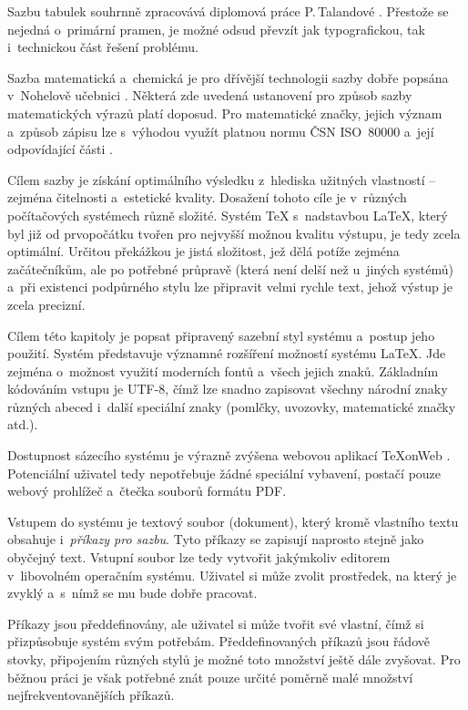 \documentclass[twoside,12pt]{article}%
\begin{document}
Sazbu tabulek souhrnně zpracovává diplomová práce P.\,Talandové
\cite{TalDipl}. Přestože se nejedná o~primární pramen, je možné odsud převzít
jak typografickou, tak i~technickou část řešení problému.

Sazba matematická a~chemická je pro dřívější technologii sazby dobře popsána
v~Nohelově učebnici \cite{Nohel}. Některá zde uvedená ustanovení pro způsob
sazby matematických výrazů platí doposud. Pro matematické značky, jejich
význam a~způsob zápisu lze s~výhodou využít platnou normu ČSN ISO~80000 a~její
odpovídající části \cite{csn80000, csn80000m}.


Cílem sazby je získání optimálního výsledku z~hlediska užitných vlastností --
zejména čitelnosti a~estetické kvality. Dosažení tohoto cíle je v~různých
počítačových systémech různě složité. Systém \TeX{} s~nadstavbou \LaTeX, který
byl již od prvopočátku tvořen pro nejvyšší možnou kvalitu výstupu, je tedy
zcela optimální. Určitou překážkou je jistá složitost, jež dělá potíže zejména
začátečníkům, ale po potřebné průpravě (která není delší než u~jiných systémů)
a~při existenci podpůrného stylu lze připravit velmi rychle text, jehož výstup
je zcela precizní.

Cílem této kapitoly je popsat připravený sazební styl systému \XeLaTeX{}
a~postup jeho použití. Systém \XeLaTeX{} představuje významné rozšíření možností
systému \LaTeX. Jde zejména o~možnost využití moderních fontů a~všech jejich
znaků. Základním kódováním vstupu je UTF-8, čímž lze snadno zapisovat všechny
národní znaky různých abeced i~další speciální znaky (pomlčky, uvozovky,
matematické značky atd.).

Dostupnost sázecího systému je výrazně zvýšena webovou aplikací \TeX onWeb
\cite{texonweb}. Potenciální uživatel tedy nepotřebuje žádné speciální vybavení,
postačí pouze webový prohlížeč a~čtečka souborů formátu PDF.

Vstupem do systému je textový soubor (dokument), který kromě vlastního textu
obsahuje i~\textit{příkazy pro sazbu}. Tyto příkazy se zapisují naprosto
stejně jako obyčejný text. Vstupní soubor lze tedy vytvořit jakýmkoliv
editorem v~libovolném operačním systému. Uživatel si může zvolit prostředek,
na který je  zvyklý a~s~nímž se mu bude dobře pracovat.

Příkazy jsou předdefinovány, ale uživatel si může tvořit své vlastní, čímž si
přizpůsobuje systém svým potřebám. Předdefinovaných příkazů jsou řádově
stovky, připojením různých stylů je možné toto množství ještě dále zvyšovat.
Pro běžnou práci je však potřebné znát pouze určité poměrně malé množství
nejfrekventovanějších příkazů.
\end{document}
